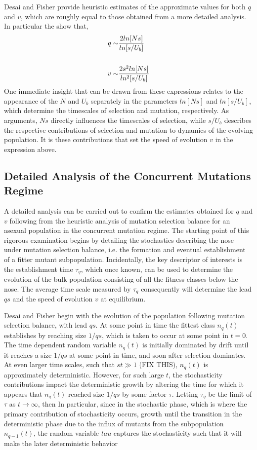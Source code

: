 \documentclass[12pt,twocolumn]{article}
\begin{document}
Desai and Fisher provide heuristic estimates of the approximate values for both $q$ and $v$, which are roughly equal to those obtained from a more detailed analysis.  In particular the show that,
\begin{align*}
q \sim & {2ln[Ns] \over ln[s/U_b]} \\   
\\
v \sim & {2s^2ln[Ns] \over ln^2[s/U_b]}
\end{align*}
One immediate insight that can be drawn from these expressions relates to the appearance of the $N$ and $U_b$ separately in the parameters $ln[Ns]$ and $ln[s/U_b]$, which determine the timescales of selection and mutation, respectively.  As arguments, $Ns$ directly influences the timescales of selection, while $s/U_b$ describes the respective contributions of selection and mutation to dynamics of the evolving population.  It is these contributions that set the speed of evolution $v$ in the expression above.   

\subsection*{Detailed Analysis of the Concurrent Mutations Regime}
A detailed analysis can be carried out to confirm the estimates obtained for $q$ and $v$ following from the heuristic analysis of mutation selection balance for an asexual population in the concurrent mutation regime.  The starting point of this rigorous examination begins by detailing the stochastics describing the nose under mutation selection balance, i.e. the formation and eventual establishment of a fitter mutant subpopulation.  Incidentally, the key descriptor of interests is the establishment time $\tau_q$, which once known, can be used to determine the evolution of the bulk population consisting of all the fitness classes below the nose.  The average time scale measured by $\tau_q$ consequently will determine the lead $qs$ and the speed of evolution $v$ at equilibrium. 

Desai and Fisher begin with the evolution of the population following mutation selection balance, with lead $qs$.  At some point in time the fittest class $n_q(t)$ establishes by reaching size $1/qs$, which is taken to occur at some point in $t=0$.  The time dependent random variable $n_q(t)$ is initially dominated by drift until it reaches a size $1/qs$ at some point in time, and soon after selection dominates.  At even larger time scales, such that $st\gg 1$ (FIX THIS), $n_q(t)$ is approximately deterministic.  However, for such large $t$, the stochasticity contributions impact the deterministic growth by altering the time for which it appears that $n_q(t)$ reached size $1/qs$ by some factor $\tau$.  Letting $\tau_q$ be the limit of $\tau$ as $t \rightarrow \infty$, then  In particular, since in the stochastic phase, which is where the primary contribution of stochasticity occurs, growth until the transition in the deterministic phase due to the influx of mutants from the subpopulation $n_{q-1}(t)$, the random variable $tau$ captures the stochasticity such that it will make the later deterministic behavior
\end{document}
